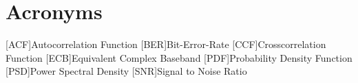 \chapter{Acronyms}
\begin{acronym}[PDF]
    [ACF]{Autocorrelation Function}
    [BER]{Bit-Error-Rate}
    [CCF]{Crosscorrelation Function}
    [ECB]{Equivalent Complex Baseband}
    [PDF]{Probability Density Function}
    [PSD]{Power Spectral Density}
    [SNR]{Signal to Noise Ratio}
\end{acronym}
